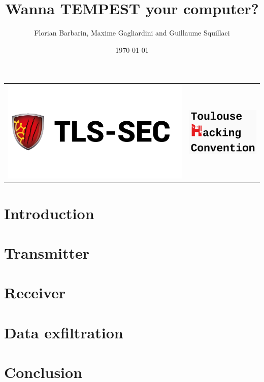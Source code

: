 \documentclass{beamer}
\title{Wanna TEMPEST your computer?}
\author{Florian Barbarin, Maxime Gagliardini and Guillaume Squillaci}
\institute{TLS-SEC}
\date{\today}
\begin{document}
\begin{frame}
\titlepage

\begin{table}
\centering
\begin{tabular}{>{\centering\arraybackslash}m{} >{\centering\arraybackslash}m{}}

\centering \includegraphics[scale=.07]{images/tlssec.png} & 
\centering \includegraphics[scale=.3]{images/thc.png}
\end{tabular}
\end{table}
\end{frame}

\section{Introduction}

	

\section{Transmitter}

	

\section{Receiver}

	
	
\section{Data exfiltration}

	
	
\section{Conclusion}

	
\end{document}
